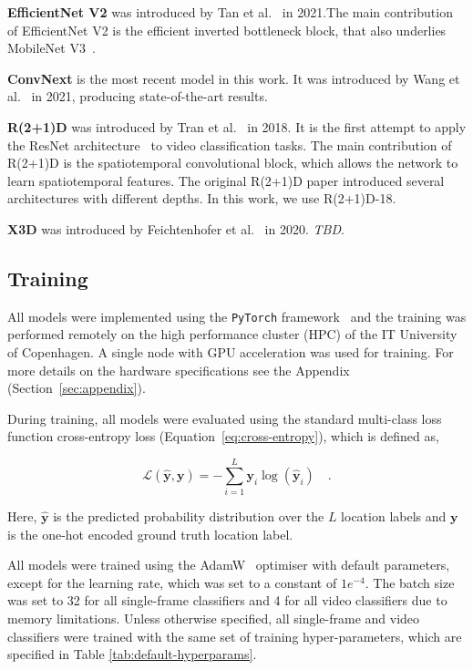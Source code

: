 \documentclass[a4paper]{article}
\begin{document}
\textbf{EfficientNet V2} was introduced by Tan et al.~\cite{efficientnetv2} in
2021.The main contribution of EfficientNet V2 is the efficient inverted
bottleneck block, that also underlies MobileNet V3~\cite{mobilenetv3}.

\textbf{ConvNext} is the most recent model in this work. It was introduced by
Wang et al.~\cite{convnext} in 2021, producing state-of-the-art results.

\textbf{R(2+1)D} was introduced by Tran et al.~\cite{r2plus1d} in 2018. It is
the first attempt to apply the ResNet architecture~\cite{resnet} to video
classification tasks. The main contribution of R(2+1)D is the spatiotemporal
convolutional block, which allows the network to learn spatiotemporal
features. The original R(2+1)D paper introduced several architectures with
different depths. In this work, we use R(2+1)D-18.

\textbf{X3D} was introduced by Feichtenhofer et al.~\cite{x3d} in 2020.
\textit{TBD}.


\subsection{Training} %
\label{sub:training}

All models were implemented using the \texttt{PyTorch} framework~\cite{pytorch} and the
training was performed remotely on the high performance cluster (HPC) of the
IT University of Copenhagen. A single node with GPU acceleration was used for
training. For more details on the hardware specifications see the Appendix
(Section~\ref{sec:appendix}).

During training, all models were evaluated using the standard multi-class loss
function cross-entropy loss (Equation~\ref{eq:cross-entropy}), which is
defined as,

\begin{equation}
  \mathcal{L}(\hat{\mathbf{y}},\mathbf{y}) = -\sum_{i=1}^{L} \mathbf{y}_i
  \log(\hat{\mathbf{y}}_i) \quad .
  \label{eq:cross-entropy}
\end{equation}


Here, $\hat{\mathbf{y}}$ is the predicted probability distribution over the $L$
location labels and $\mathbf{y}$ is the one-hot encoded ground truth location
label. 

All models were trained using the AdamW~\cite{adamw} optimiser with default
parameters, except for the learning rate, which was set to a constant of
$1e^{-4}$. The batch size was set to 32 for all single-frame classifiers and 4 for
all video classifiers due to memory limitations. Unless otherwise specified,
all single-frame and video classifiers were trained with the same set of training
hyper-parameters, which are specified in Table \ref{tab:default-hyperparams}. 
\end{document}
